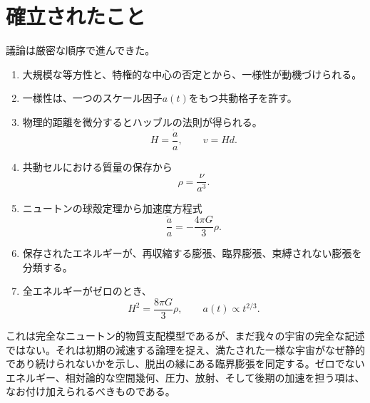 \section{確立されたこと}

議論は厳密な順序で進んできた。
\begin{enumerate}
\item 大規模な等方性と、特権的な中心の否定とから、一様性が動機づけられる。
\item 一様性は、一つのスケール因子\(a(t)\)をもつ共動格子を許す。
\item 物理的距離を微分するとハッブルの法則が得られる。
  \[
  H=\frac{\dot a}{a},
  \qquad
  v=Hd.
  \]
\item 共動セルにおける質量の保存から
  \[
  \rho=\frac{\nu}{a^3}.
  \]
\item ニュートンの球殻定理から加速度方程式
  \[
  \frac{\ddot a}{a}=-\frac{4\pi G}{3}\rho.
  \]
\item 保存されたエネルギーが、再収縮する膨張、臨界膨張、束縛されない膨張を分類する。
\item 全エネルギーがゼロのとき、
  \[
  H^2=\frac{8\pi G}{3}\rho,
  \qquad
  a(t)\propto t^{2/3}.
  \]
\end{enumerate}

これは完全なニュートン的物質支配模型であるが、まだ我々の宇宙の完全な記述ではない。それは初期の減速する論理を捉え、満たされた一様な宇宙がなぜ静的であり続けられないかを示し、脱出の縁にある臨界膨張を同定する。ゼロでないエネルギー、相対論的な空間幾何、圧力、放射、そして後期の加速を担う項は、なお付け加えられるべきものである。
